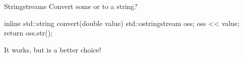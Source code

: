 \begin{frame}[fragile]{Stringstreams}
    Convert some  or  to a string?
    \begin{cpp}
inline std::string convert(double value) {
  std::ostringstream oss;
  oss << value;
  return oss.str();
}
    \end{cpp}
    \pause
    It works, but  is a better choice!
\end{frame}